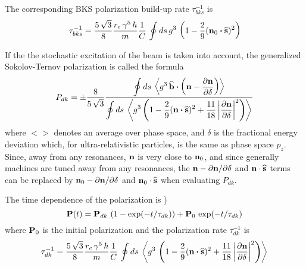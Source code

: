 The corresponding BKS polarization build-up rate $\tau_{bks}^{-1}$ is
\begin{equation}
  \tau_{bks}^{-1} = \frac{5 \, \sqrt{3}}{8} \frac{r_e \, \gamma^5 \, \hbar}{m} \frac{1}{C} \,
    \oint ds \, g^3 \, \left( 1 - \frac{2}{9} ({\bf n}_0 \mathbin{\boldsymbol{\cdot}} \widehat{{\bf s}})^2 \right)
  \label{tbks}
\end{equation}

If the the stochastic excitation of the beam is taken into account, the generalized Sokolov-Ternov
polarization is called the  formula
\begin{equation}
  P_{dk} = \pm \frac{8}{5 \, \sqrt{3}}
  \frac{\displaystyle \oint ds \, \left< g^3 \, \widehat{{\bf b}} \mathbin{\boldsymbol{\cdot}} 
    \left( {\bf n} - \frac{\partial {\bf n}}{\partial \delta} \right) \right>}
  {\displaystyle \oint ds \, \left< g^3 \left( 1 - \frac{2}{9} ({\bf n} \mathbin{\boldsymbol{\cdot}} \widehat{{\bf s}})^2 + 
    \frac{11}{18} \left| \frac{\partial {\bf n}}{\partial \delta} \right|^2 \right) \right>}
\end{equation}
where $<>$ denotes an average over phase space, and $\delta$ is the fractional energy deviation
which, for ultra-relativistic particles, is the same as phase space $p_z$. Since, away from any
resonances, ${\bf n}$ is very close to ${\bf n}_0$, and since generally machines are tuned away from any
resonances, the ${\bf n} - \partial{\bf n}/\partial\delta$ and ${\bf n}\cdot\widehat{{\bf s}}$ terms can be replaced
by ${\bf n}_0 - \partial{\bf n}/\partial\delta$ and ${\bf n}_0\cdot\widehat{{\bf s}}$ when evaluating $P_{dk}$.

The time dependence of the polarization is \cite{b:barber99})
\begin{equation}
  {\bf P}(t) = {\bf P}_{dk} \, \left( 1 - \exp(-t/\tau_{dk}) \right) + {\bf P}_0 \, \exp(-t/\tau_{dk})
\end{equation}
where ${\bf P}_0$ is the initial polarization and the polarization rate $\tau_{dk}^{-1}$ is 
\begin{equation}
  \tau_{dk}^{-1} = \frac{5 \, \sqrt{3}}{8} \frac{r_e \, \gamma^5 \, \hbar}{m}
  \frac{1}{C} \, \oint ds \, \left< g^3 \, \left( 1 - \frac{2}{9} ({\bf n} \mathbin{\boldsymbol{\cdot}} \widehat{{\bf s}})^2 + 
  \frac{11}{18} \left| \frac{\partial {\bf n}}{\partial \delta} \right|^2 \right) \right>
  \label{t583}
\end{equation}

